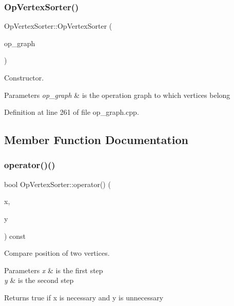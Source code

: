 \subsubsection{\texorpdfstring{Op\+Vertex\+Sorter()}{OpVertexSorter()}}
{\footnotesize\ttfamily Op\+Vertex\+Sorter\+::\+Op\+Vertex\+Sorter (\begin{DoxyParamCaption}\item[{const \hyperlink{op__graph_8hpp_a9a0b240622c47584bee6951a6f5de746}{Op\+Graph\+Const\+Ref}}]{op\+\_\+graph }\end{DoxyParamCaption})\hspace{0.3cm}{\ttfamily [explicit]}}



Constructor. 


\begin{DoxyParams}{Parameters}
{\em op\+\_\+graph} & is the operation graph to which vertices belong \\
\hline
\end{DoxyParams}


Definition at line 261 of file op\+\_\+graph.\+cpp.



\subsection{Member Function Documentation}
\mbox{\label{classOpVertexSorter_ad063d342c05cd002c65a51926697a27d}} 
\subsubsection{\texorpdfstring{operator()()}{operator()()}}
{\footnotesize\ttfamily bool Op\+Vertex\+Sorter\+::operator() (\begin{DoxyParamCaption}\item[{const \hyperlink{graph_8hpp_abefdcf0544e601805af44eca032cca14}{vertex}}]{x,  }\item[{const \hyperlink{graph_8hpp_abefdcf0544e601805af44eca032cca14}{vertex}}]{y }\end{DoxyParamCaption}) const}



Compare position of two vertices. 


\begin{DoxyParams}{Parameters}
{\em x} & is the first step \\
\hline
{\em y} & is the second step \\
\hline
\end{DoxyParams}
\begin{DoxyReturn}{Returns}
true if x is necessary and y is unnecessary 
\end{DoxyReturn}


